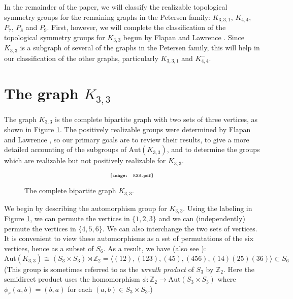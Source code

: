 \documentclass[11]{amsart}
\def\Z{\mathbb{Z}}
\newcommand{\semi}{{\rtimes}}
\def\Aut{{\mathrm{Aut}}}
\theoremstyle{definition}
\theoremstyle{remark}
\begin{document}
In the remainder of the paper, we will classify the realizable topological symmetry groups for the remaining graphs in the Petersen family: $K_{3,3,1}$, $K_{4,4}^-$, $P_7$, $P_8$ and $P_9$.  First, however, we will complete the classification of the topological symmetry groups for $K_{3,3}$ begun by Flapan and Lawrence \cite{fl}. Since $K_{3,3}$ is a subgraph of several of the graphs in the Petersen family, this will help in our classification of the other graphs, particularly $K_{3,3,1}$ and $K_{4,4}^-$.

\section{The graph $K_{3,3}$}\label{S:K33}

The graph $K_{3,3}$ is the complete bipartite graph with two sets of three vertices, as shown in Figure \ref{F:K33}. The positively realizable groups were determined by Flapan and Lawrence \cite{fl}, so our primary goals are to review their results, to give a more detailed accounting of the subgroups of $\Aut(K_{3,3})$, and to determine the groups which are realizable but not positively realizable for $K_{3,3}$.

\begin{figure} [htbp]
$$\scalebox{.7}{\texttt{[image: K33.pdf]}}$$
\caption{The complete bipartite graph $K_{3,3}$.}
\label{F:K33}
\end{figure}

We begin by describing the automorphism group for $K_{3,3}$. Using the labeling in Figure \ref{F:K33}, we can permute the vertices in $\{1, 2, 3\}$ and we can (independently) permute the vertices in $\{4,5,6\}$.  We can also interchange the two sets of vertices.  It is convenient to view these automorphisms as a set of permutations of the six vertices, hence as a subset of $S_6$.  As a result, we have (also see \cite{fl}):
$$\Aut(K_{3,3}) \cong (S_3 \times S_3) \semi \Z_2 = \langle (12), (123), (45), (456), (14)(25)(36) \rangle \subset S_6$$
(This group is sometimes referred to as the {\em wreath product} of $S_3$ by $\Z_2$. Here the semidirect product uses the homomorphism $\phi: \Z_2 \rightarrow \Aut(S_3 \times S_3)$ where $\phi_r(a,b) = (b,a)$ for each $(a,b) \in S_3 \times S_3$.)
\end{document}
